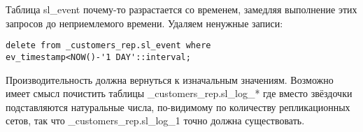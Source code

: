 Таблица sl\_event почему-то разрастается со временем, замедляя выполнение этих
запросов до неприемлемого времени. Удаляем ненужные записи:
\begin{lstlisting}[label=lst:slony20,caption=Устранение неисправностей]
delete from _customers_rep.sl_event where
ev_timestamp<NOW()-'1 DAY'::interval;
\end{lstlisting}

Производительность должна вернуться к изначальным значениям.
Возможно имеет смысл почистить таблицы \_customers\_rep.sl\_log\_* где
вместо звёздочки подставляются натуральные числа, по-видимому по
количеству репликационных сетов, так что \_customers\_rep.sl\_log\_1
точно должна существовать.